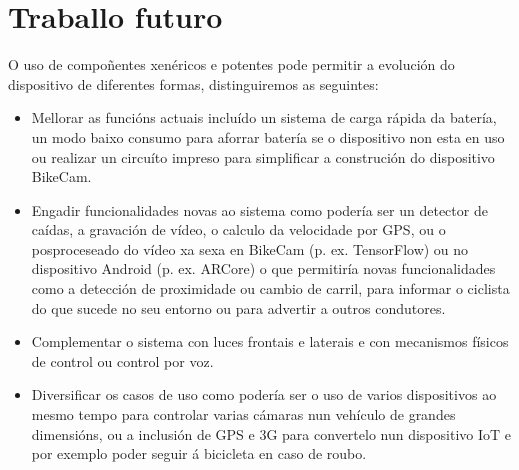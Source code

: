 \section{Traballo futuro}
O uso de compoñentes xenéricos e potentes pode permitir a evolución do dispositivo de diferentes formas, distinguiremos as seguintes:
\begin{itemize}
  \item Mellorar as funcións actuais incluído un sistema de carga rápida da batería, un modo baixo consumo para aforrar batería se o dispositivo non esta en uso ou realizar un circuíto impreso para simplificar a construción do dispositivo BikeCam.
  \item Engadir funcionalidades novas ao sistema como podería ser un detector de caídas, a gravación de vídeo, o calculo da velocidade por GPS, ou o posproceseado do vídeo xa sexa en BikeCam (p. ex. TensorFlow)  ou no dispositivo Android (p. ex. ARCore) o que permitiría novas funcionalidades como a detección de proximidade ou cambio de carril, para informar o ciclista do que sucede no seu entorno ou para advertir a outros condutores.
  \item Complementar o sistema con luces frontais e laterais e con mecanismos físicos de control ou control por voz.
  \item Diversificar os casos de uso como podería ser o uso de varios dispositivos ao mesmo tempo para controlar varias cámaras nun vehículo de grandes dimensións, ou a inclusión de GPS e 3G para convertelo nun dispositivo IoT e por exemplo poder seguir á bicicleta en caso de roubo.
\end{itemize}
